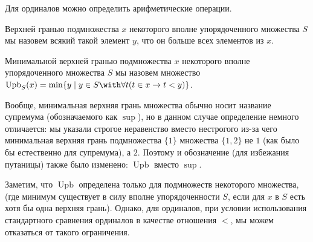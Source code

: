 Для ординалов можно определить арифметические операции.

\begin{definition}
Верхней гранью подмножества $x$ некоторого вполне упорядоченного
множества $S$ мы назовем всякий такой элемент $y$, что он больше
всех элементов из $x$.

Минимальной верхней гранью подмножества $x$ некоторого вполне упорядоченного
множества $S$ мы назовем множество 
$\operatorname{Upb}_S(x) = \min \{y \mid y \in S \with \forall t (t \in x \rightarrow t < y)\}$.
\end{definition}

Вообще, минимальная верхняя грань множества обычно носит название супремума
(обозначаемого как $\sup$), но в данном случае определение немного отличается:
мы указали строгое неравенство вместо нестрогого из-за чего минимальная верхняя
грань подмножества $\{1\}$ множества $\{1,2\}$ не $1$ (как было бы естественно
для супремума), а $2$. Поэтому и обозначение (для избежания путаницы) также было
изменено: $\operatorname{Upb}$ вместо $\sup$.

Заметим, что $\operatorname{Upb}$ определена только для подмножеств некоторого множества, 
(где минимум существует в силу вполне упорядоченности $S$, если для $x$ в $S$
есть хотя бы одна верхняя грань). Однако, для ординалов, при условии использования
стандартного сравнения ординалов в качестве отношения $<$, мы можем отказаться
от такого ограничения.


